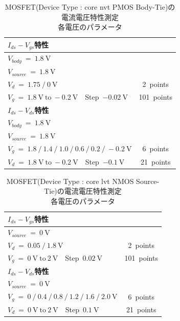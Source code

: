 			\begin{table}[htb]
				\begin{center}
					\begin{tabular}{| l c |} \hline \hline
						{\bf $I_{ds}-V_{gs}$特性} & \ \\ \hline
						$V_{body}\ =\  1.8\ \mathrm{V}$ & \ \\
						$V_{source}\ =\ 1.8\ \mathrm{V}$ & \ \\
						$V_{d}\ =\ 1.75\ /\ 0\ \mathrm{V}$ & 2\ points \\
						$V_{g}\ =\ 1.8\ \mathrm{V}\ \mathrm{to}\ -0.2\ \mathrm{V}$\ \ Step\ $-0.02\ \mathrm{V}$ & 101\ points \\ \hline \hline
						{\bf $I_{ds}-V_{ds}$特性} & \ \\ \hline
						$V_{body}\ =\  1.8\ \mathrm{V}$ & \ \\
						$V_{source}\ =\ 1.8\ \mathrm{V}$ & \ \\
						$V_{g}\ =\ 1.8\ /\ 1.4\ /\ 1.0\ /\ 0.6\ /\ 0.2\ /\ -0.2\ \mathrm{V}$ & 6\ points \\
						$V_{d}\ =\ 1.8\ \mathrm{V}\ \mathrm{to}\ -0.2\ \mathrm{V}$\ \ Step\ $-0.1\ \mathrm{V}$ & 21\ points \\ \hline
					\end{tabular}
					\caption{MOSFET(Device Type : core nvt PMOS Body-Tie)の電流電圧特性測定\\各電圧のパラメータ}
					\label{tab:PBT_bias}
				\end{center}
			\end{table}
			
			\begin{table}[htb]
				\begin{center}
					\begin{tabular}{| l c |} \hline \hline
						{\bf $I_{ds}-V_{gs}$特性} & \ \\ \hline
						$V_{source}\ =\ 0\ \mathrm{V}$ & \ \\
						$V_{d}\ =\ 0.05\ /\ 1.8\ \mathrm{V}$ & 2\ points \\
						$V_{g}\ =\ 0\ \mathrm{V}\ \mathrm{to}\ 2\ \mathrm{V}$\ \ Step\ $0.02\ \mathrm{V}$ & 101\ points \\ \hline \hline
						{\bf $I_{ds}-V_{ds}$特性} & \ \\ \hline
						$V_{source}\ =\ 0\ \mathrm{V}$ & \ \\
						$V_{g}\ =\ 0\ /\ 0.4\ /\ 0.8\ /\ 1.2\ /\ 1.6\ /\ 2.0\ \mathrm{V}$ & 6\ points \\
						$V_{d}\ =\ 0\ \mathrm{V}\ \mathrm{to}\ 2\ \mathrm{V}$\ \ Step\ $0.1\ \mathrm{V}$ & 21\ points \\ \hline
					\end{tabular}
					\caption{MOSFET(Device Type : core lvt NMOS Source-Tie)の電流電圧特性測定\\各電圧のパラメータ}
					\label{tab:NST_bias}
				\end{center}
			\end{table}

